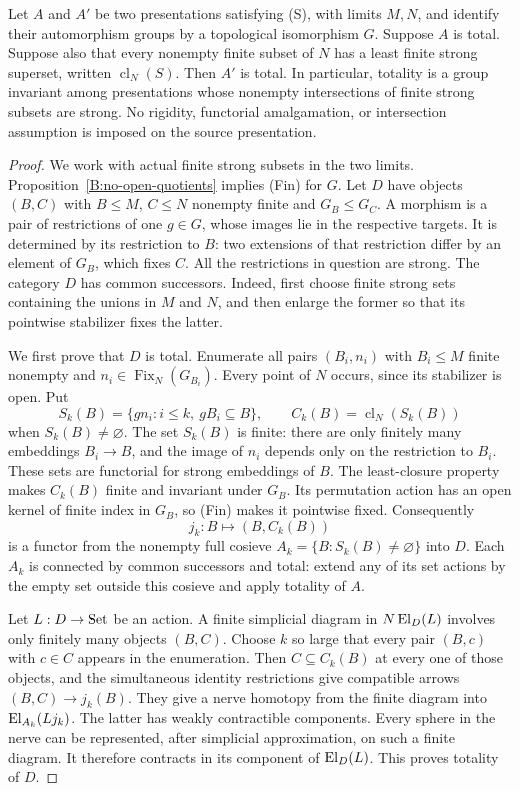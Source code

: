 \begin{theorem}
\label{A:totality-finite-closure}
Let $A$ and $A'$ be two presentations satisfying (S), with limits
$M,N$, and identify their automorphism groups by a topological
isomorphism $G$. Suppose $A$ is total. Suppose also that every
nonempty finite subset of $N$ has a least finite strong superset,
written $\operatorname{cl}_N(S)$. Then $A'$ is total.
In particular, totality is a group invariant among presentations
whose nonempty intersections of finite strong subsets are strong.
No rigidity, functorial amalgamation, or intersection assumption
is imposed on the source presentation.
\end{theorem}
\begin{proof}
We work with actual finite strong subsets in the two limits.
Proposition~\ref{B:no-open-quotients} implies (Fin) for $G$.
Let $D$ have objects $(B,C)$ with $B\le M$, $C\le N$ nonempty
finite and $G_B\le G_C$. A morphism is a pair of restrictions
of one $g\in G$, whose images lie in the respective targets.
It is determined by its restriction to $B$: two extensions of
that restriction differ by an element of $G_B$, which fixes $C$.
All the restrictions in question are strong. The category $D$
has common successors. Indeed, first choose finite strong sets
containing the unions in $M$ and $N$, and then enlarge the former
so that its pointwise stabilizer fixes the latter.

We first prove that $D$ is total. Enumerate all pairs
$(B_i,n_i)$ with $B_i\le M$ finite nonempty and
$n_i\in\operatorname{Fix}_N(G_{B_i})$. Every point of $N$
occurs, since its stabilizer is open. Put
\[
 S_k(B)=\{g n_i: i\le k,\ gB_i\subseteq B\},
 \qquad C_k(B)=\operatorname{cl}_N(S_k(B))
\]
when $S_k(B)\ne\varnothing$. The set $S_k(B)$ is finite:
there are only finitely many embeddings $B_i\to B$, and the
image of $n_i$ depends only on the restriction to $B_i$.
These sets are functorial for strong embeddings of $B$.
The least-closure property makes $C_k(B)$ finite and invariant
under $G_B$. Its permutation action has an open kernel of
finite index in $G_B$, so (Fin) makes it pointwise fixed.
Consequently
\[
 j_k:B\longmapsto(B,C_k(B))
\]
is a functor from the nonempty full cosieve
$A_k=\{B:S_k(B)\ne\varnothing\}$ into $D$.
Each $A_k$ is connected by common successors and total:
extend any of its set actions by the empty set outside this
cosieve and apply totality of $A$.

Let $L:D\to\mathrm{Set}$ be an action. A finite simplicial diagram
in $N\operatorname{El}_D(L)$ involves only finitely many objects $(B,C)$.
Choose $k$ so large that every pair $(B,c)$ with $c\in C$
appears in the enumeration. Then $C\subseteq C_k(B)$ at
every one of those objects, and the simultaneous identity
restrictions give compatible arrows
$(B,C)\to j_k(B)$. They give a nerve homotopy from the finite
diagram into $\operatorname{El}_{A_k}(L j_k)$. The latter has weakly
contractible components. Every sphere in the nerve can be
represented, after simplicial approximation, on such a finite
diagram. It therefore contracts in its component of
$\operatorname{El}_D(L)$. This proves totality of $D$.


\end{proof}
